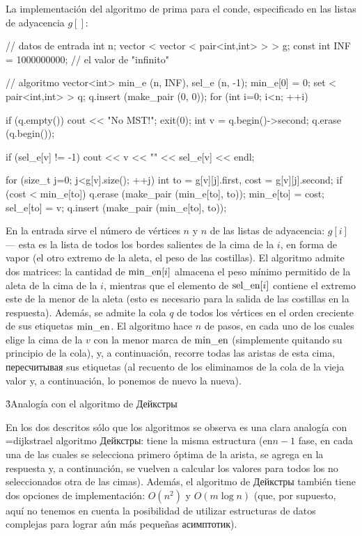 La implementación del algoritmo de prima para el conde, especificado en las listas de adyacencia $g[]$:

\code
// datos de entrada
int n;
vector < vector < pair<int,int> > > g;
const int INF = 1000000000; // el valor de "infinito"

// algoritmo
vector<int> min_e (n, INF), sel_e (n, -1);
min_e[0] = 0;
set < pair<int,int> > q;
q.insert (make_pair (0, 0));
for (int i=0; i<n; ++i) {
if (q.empty()) {
cout << "No MST!";
exit(0);
}
int v = q.begin()->second;
q.erase (q.begin());

if (sel_e[v] != -1)
cout << v << "" << sel_e[v] << endl;

for (size_t j=0; j<g[v].size(); ++j) {
int to = g[v][j].first,
cost = g[v][j].second;
if (cost < min_e[to]) {
q.erase (make_pair (min_e[to], to));
min_e[to] = cost;
sel_e[to] = v;
q.insert (make_pair (min_e[to], to));
}
}
}
\endcode

En la entrada sirve el número de vértices $n$ y $n$ de las listas de adyacencia: $g[i]$ --- esta es la lista de todos los bordes salientes de la cima de la $i$, en forma de vapor (el otro extremo de la aleta, el peso de las costillas). El algoritmo admite dos matrices: la cantidad de ${\rm min\_en}[i]$ almacena el peso mínimo permitido de la aleta de la cima de la $i$, mientras que el elemento de ${\rm sel\_en}[i]$ contiene el extremo este de la menor de la aleta (esto es necesario para la salida de las costillas en la respuesta). Además, se admite la cola $q$ de todos los vértices en el orden creciente de sus etiquetas ${\rm min\_en}$. El algoritmo hace $n$ de pasos, en cada uno de los cuales elige la cima de la $v$ con la menor marca de ${\rm min\_en}$ (simplemente quitando su principio de la cola), y, a continuación, recorre todas las aristas de esta cima, пересчитывая sus etiquetas (al recuento de los eliminamos de la cola de la vieja valor y, a continuación, lo ponemos de nuevo la nueva).


\h3{Analogía con el algoritmo de Дейкстры}

En los dos descritos sólo que los algoritmos se observa es una clara analogía con \algohref=dijkstra{el algoritmo Дейкстры}: tiene la misma estructura (en$n-1$ fase, en cada una de las cuales se selecciona primero óptima de la arista, se agrega en la respuesta y, a continuación, se vuelven a calcular los valores para todos los no seleccionados otra de las cimas). Además, el algoritmo de Дейкстры también tiene dos opciones de implementación: $O(n^2)$ y $O(m \log n)$ (que, por supuesto, aquí no tenemos en cuenta la posibilidad de utilizar estructuras de datos complejas para lograr aún más pequeñas асимптотик).

